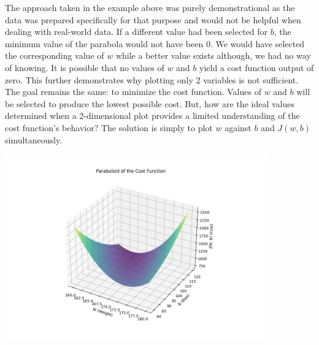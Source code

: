 \documentclass{article}
\begin{document}
\begin{center}
\end{center}

The approach taken in the example above was purely demonstrational as the data was prepared specifically for that purpose and would not be helpful when dealing with real-world data. If a different value had been selected for $b$, the minimum value of the parabola would not have been 0. We would have selected the corresponding value of $w$ while a better value exists although, we had no way of knowing. It is possible that no values of $w$ and $b$ yield a cost function output of zero. This further demonstrates why plotting only 2 variables is not sufficient. The goal remains the same: to minimize the cost function. Values of $w$ and $b$ will be selected to produce the lowest possible cost. But, how are the ideal values determined when a 2-dimensional plot provides a limited understanding of the cost function's behavior? The solution is simply to plot $w$ against $b$ and $J(w, b)$ simultaneously.

\includegraphics[width=320pt]{images/paraboloid.png}
\end{document}
